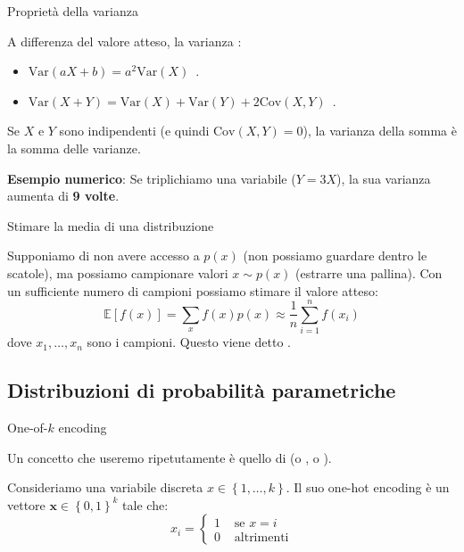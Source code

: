 \documentclass[12pt,aspectratio=169]{beamer}
\begin{document}
\begin{frame}{Proprietà della varianza}

	A differenza del valore atteso, la varianza :
	\begin{itemize}
		\item $\text{Var}(aX + b) = a^2\text{Var}(X)$ \,.
		\item $\text{Var}(X + Y) = \text{Var}(X) + \text{Var}(Y) + 2\text{Cov}(X, Y)$ \,.
	\end{itemize}

	Se $X$ e $Y$ sono indipendenti (e quindi $\text{Cov}(X,Y)=0$), la varianza della somma è la somma delle varianze.

	\begin{tcolorbox}
		\textbf{Esempio numerico}: Se triplichiamo una variabile ($Y=3X$), la sua varianza aumenta di \textbf{9 volte}.
	\end{tcolorbox}

\end{frame}

\begin{frame}{Stimare la media di una distribuzione}
	
	Supponiamo di non avere accesso a $p(x)$ (non possiamo guardare dentro le scatole), ma possiamo campionare valori $x \sim p(x)$ (estrarre una pallina). Con un sufficiente numero di campioni possiamo stimare il valore atteso:
	\begin{equation}
		\mathbb{E}[f(x)] = \sum_{x} f(x)p(x) \approx \frac{1}{n}\sum_{i=1}^n f(x_i)
	\end{equation}
	dove $x_1, \ldots, x_n$ sono i campioni. Questo viene detto .
	
\end{frame}

\subsection{Distribuzioni di probabilità parametriche}

\begin{frame}{One-of-$k$ encoding}
	
	Un concetto che useremo ripetutamente è quello di  (o , o ). 
	
	Consideriamo una variabile discreta $x \in \left\{1, \ldots, k\right\}$. Il suo one-hot encoding è un vettore $\mathbf{x} \in \left\{0,1\right\}^k$ tale che:
	\begin{equation}
		x_i = \begin{cases} 1 & \text{ se } x=i \\
		0 & \text{ altrimenti} \end{cases}
	\end{equation}
	
\end{frame}
\end{document}
